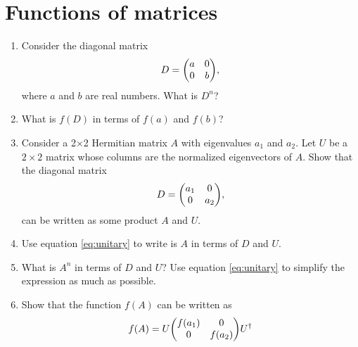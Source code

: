 \documentclass{article}
\begin{document}
\section{Functions of matrices}
  \begin{enumerate}[label=(\alph*)]
      \item\label{it:D} Consider the diagonal matrix
      \begin{equation}
      D = \mqty(a&0\\0&b),
      \end{equation}
      where $a$ and $b$ are real numbers.  What is $D^n$?
      \vspace{1.5cm}
      \item What is $f(D)$ in terms of $f(a)$ and $f(b)$?
      \vspace{2cm}
      \item Consider a 2$\times$2 Hermitian matrix $A$ with eigenvalues $a_1$ and $a_2$. Let $U$ be a $2\times2$ matrix whose columns are the normalized eigenvectors of $A$.  Show that the diagonal matrix
      \begin{equation}
      D = \mqty(a_1&0\\0&a_2),
      \end{equation}
      can be written as some product 
      $A$ and $U$.
      \vspace{2cm}
      \item Use equation \ref{eq:unitary} to write is $A$ in terms of $D$ and $U$.
      \vspace{2cm}
      \item What is $A^n$ in terms of $D$ and $U$? Use equation \ref{eq:unitary} to simplify the expression as much as possible.
      \vspace{2cm}
      \item\label{it:f(A)} Show that the function $f(A)$ can be written as
      \begin{equation}
      f(A)
      = U
      \mqty(f(a_1) &0\\0 &f(a_2))
      U^\dagger
      \end{equation}
      \vspace{2.5cm}
    \end{enumerate}
\newpage
\end{document}
